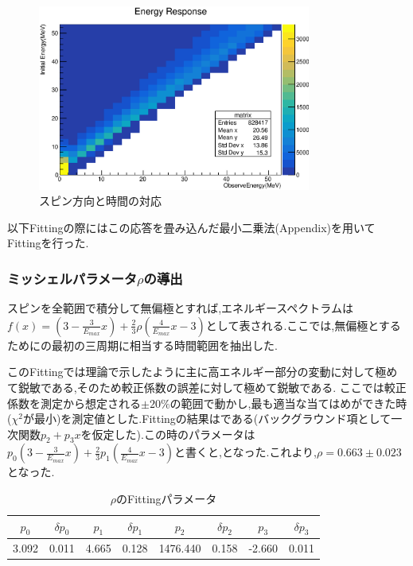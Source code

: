 \begin{figure}[bht]
  \centering
  \includegraphics[width=0.8\textwidth]{figure/hatano/response.eps}
  \caption{スピン方向と時間の対応}
  \label{hatano_fig:response}
\end{figure}

以下Fittingの際にはこの応答を畳み込んだ最小二乗法(Appendix)を用いてFittingを行った.

\subsubsection{ミッシェルパラメータ$\rho$の導出}
スピンを全範囲で積分して無偏極とすれば,エネルギースペクトラムは$f(x)=(3-\frac{3}{E_{max}}x)+\frac{2}{3}\rho(\frac{4}{E_{max}}x-3)$として表される.ここでは,無偏極とするためにの最初の三周期に相当する時間範囲を抽出した.

このFittingでは理論で示したように主に高エネルギー部分の変動に対して極めて鋭敏である,そのため較正係数の誤差に対して極めて鋭敏である.
ここでは較正係数を測定から想定される$\pm20\%$の範囲で動かし,最も適当な当てはめができた時($\chi^2$が最小)を測定値とした.Fittingの結果はである(バックグラウンド項として一次関数$p_2+p_3x$を仮定した).この時のパラメータは$p_0(3-\frac{3}{E_{max}}x)+\frac{2}{3}p_1(\frac{4}{E_{max}}x-3)$と書くと,となった.これより,$\rho=0.663 \pm 0.023$となった.
\begin{table}[bht]
  \centering
  \caption{$\rho$のFittingパラメータ}
  \begin{tabular}{cccccccc}
    $p_0$ & $\delta p_0$ & $p_1$ & $\delta p_1$ & $p_2$ & $\delta p_2$ & $p_3$ & $\delta p_3$ \\ \hline
    3.092 & 0.011 & 4.665 & 0.128 & 1476.440 & 0.158 & -2.660 & 0.011
  \end{tabular}
  \label{hatano_tab:rho}
\end{table}

